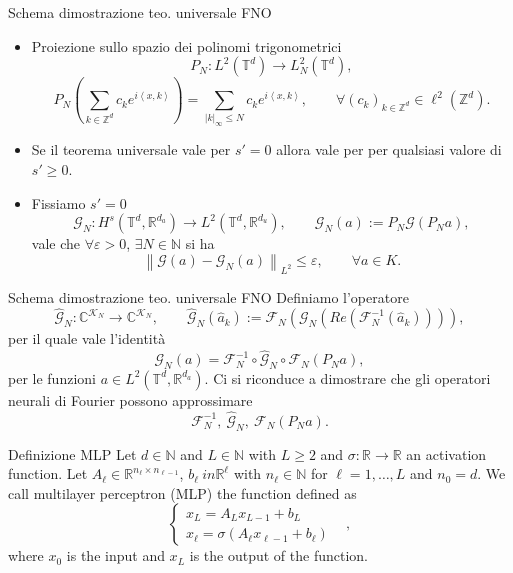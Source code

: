 \documentclass{beamer}
\newcommand{\numberset}{\mathbb}
\newcommand{\N}{\numberset{N}}
\newcommand{\Z}{\numberset{Z}}
\newcommand{\R}{\numberset{R}}
\newcommand{\C}{\numberset{C}}
\begin{document}
\begin{frame}[noframenumbering]{Schema dimostrazione teo. universale FNO}
	\centering
	\begin{itemize}
		\item Proiezione sullo spazio dei polinomi trigonometrici
		\[ P_N: L^{2}(\mathbb{T}^d) \to L^{2}_N(\mathbb{T}^d),  \]
		\[ P_N\left(\sum_{k \in \Z^d} c_k e^{i \left\langle x, k \right\rangle } \right) = \sum_{|k|_{\infty}\le N} c_k e^{i \left\langle x, k \right\rangle }, \qquad \forall (c_k)_{k \in \Z^d} \in \ell^2(\Z^d). \]
		\item Se il teorema universale vale per $ s'=0 $ allora vale per per qualsiasi valore di $ s' \ge 0 $.
		\item Fissiamo $ s' = 0 $  \[ \mathcal{G}_{N}: H^{s}(\mathbb{T}^d, \R^{d_a}) \to L^2(\mathbb{T}^d, \R^{d_u}), \qquad \mathcal{G}_{N}(a):= P_N  \mathcal{G} (P_Na), \]
		vale che $ \forall \varepsilon > 0 $, $ \exists N \in \N $ si ha
		\[ \left\|\mathcal{G}(a) - \mathcal{G}_N(a) \right\|_{L^2} \le \varepsilon, \qquad \forall a \in K. \]
	\end{itemize}
\end{frame}

\begin{frame}[noframenumbering]{Schema dimostrazione teo. universale FNO}
	Definiamo l'operatore
	\[ \widehat{\mathcal{G}}_N: \C^{\mathcal{K}_N} \to\C^{\mathcal{K}_N}, \qquad \widehat{\mathcal{G}}_N(\widehat{a}_k) := \mathcal{F}_N (\mathcal{G}_N ( Re (\mathcal{F}_N^{-1}(\widehat{a}_k)))), \]
	per il quale vale l'identità
	\[ \mathcal{G}_N (a) = \mathcal{F}_N^{-1} \circ \widehat{\mathcal{G}}_N \circ \mathcal{F}_N (P_Na), \]
	per le funzioni $  a \in L^2(\mathbb{T}^d, \R^{d_a}) $. Ci si riconduce a dimostrare che gli operatori neurali di Fourier possono approssimare
	\[ \mathcal{F}_N^{-1}, \ \widehat{\mathcal{G}}_N , \ \mathcal{F}_N (P_Na). \]
\end{frame}

\begin{frame}[noframenumbering]{Definizione MLP}
	Let $ d \in \N $ and $ L\in \N $ with $ L \ge 2 $ and $ \sigma : \R \to \R  $ an activation function. Let $ A_{\ell} \in \R^{n_{\ell}\times n_{\ell-1}} $, $ b_{\ell} \ in \R^{\ell} $ with $ n_{\ell}\in \N $ for $ \ell = 1, \dots, L $	and $ n_{0} = d $. We call multilayer perceptron (MLP) the function defined as
	\[ \begin{cases}
		x_{L} = A_{L}x_{L-1} + b_{L} \qquad & \\
		x_{\ell} = \sigma\left( A_{\ell}x_{\ell-1} + b_{\ell} \right) 
	\end{cases}, \]
	where $ x_0 $ is the input and $ x_{L} $ is the output of the function.
\end{frame}
\end{document}
